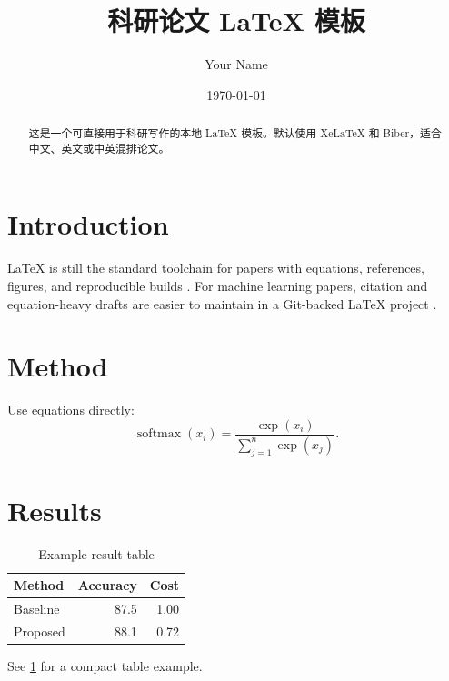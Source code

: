 \documentclass[UTF8,11pt,a4paper,fontset=fandol]{ctexart}
\title{科研论文 LaTeX 模板}
\author{Your Name}
\date{\today}
\begin{document}
\maketitle

\begin{abstract}
这是一个可直接用于科研写作的本地 LaTeX 模板。默认使用 XeLaTeX 和
Biber，适合中文、英文或中英混排论文。
\end{abstract}

\section{Introduction}

LaTeX is still the standard toolchain for papers with equations, references,
figures, and reproducible builds \cite{lamport1986latex}. For machine learning
papers, citation and equation-heavy drafts are easier to maintain in a Git-backed
LaTeX project \cite{vaswani2017attention}.

\section{Method}

Use equations directly:
\begin{equation}
  \operatorname{softmax}(x_i) =
  \frac{\exp(x_i)}{\sum_{j=1}^{n}\exp(x_j)}.
\end{equation}

\section{Results}

\begin{table}[htbp]
  \centering
  \caption{Example result table}
  \label{tab:results}
  \begin{tabular}{lrr}
    \toprule
    Method & Accuracy & Cost \\
    \midrule
    Baseline & 87.5 & 1.00 \\
    Proposed & 88.1 & 0.72 \\
    \bottomrule
  \end{tabular}
\end{table}

See \cref{tab:results} for a compact table example.

\printbibliography
\end{document}
